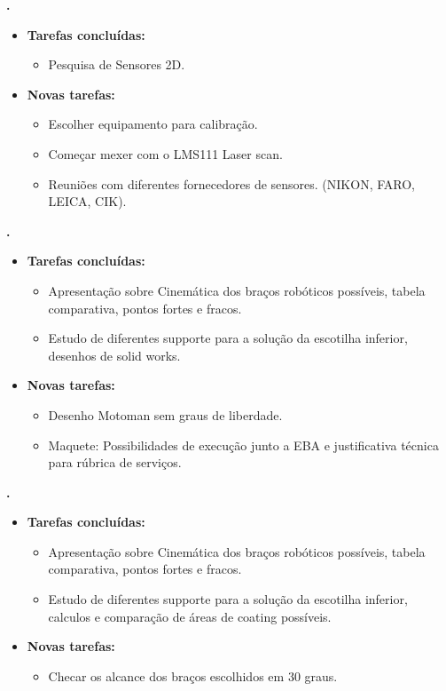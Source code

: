 \textbf{\gabriel.} 
	\begin{itemize}
		\item \textbf{Tarefas concluídas:}
			\begin{itemize}    
				\item Pesquisa de Sensores 2D.
			\end{itemize}
		
		\item \textbf{Novas tarefas:}
			\begin{itemize} 
				\item Escolher equipamento para calibração.
				\item Começar mexer com o LMS111 Laser scan. 
				\item Reuniões com diferentes fornecedores de sensores. (NIKON, FARO,
				LEICA, CIK).
			\end{itemize}
	\end{itemize}
					
			
   \textbf{.} 
	\begin{itemize}
		\item \textbf{Tarefas concluídas:}
			\begin{itemize}    
				\item Apresentação sobre Cinemática dos braços robóticos possíveis, 
				tabela comparativa, pontos fortes e fracos.
				\item Estudo de diferentes supporte para a solução da escotilha inferior,
				desenhos de solid works.
			\end{itemize}
		
		\item \textbf{Novas tarefas:}
			\begin{itemize} 
			    \item Desenho Motoman sem graus de liberdade.
			    \item Maquete: Possibilidades de execução junto a EBA e justificativa
			    técnica para rúbrica de serviços.
			\end{itemize}
	\end{itemize}

			
   \textbf{\Renan.} 
	\begin{itemize}
		\item \textbf{Tarefas concluídas:}
			\begin{itemize}    
				\item Apresentação sobre Cinemática dos braços robóticos possíveis, 
				tabela comparativa, pontos fortes e fracos.
				\item Estudo de diferentes supporte para a solução da escotilha inferior,
				calculos e comparação de áreas de coating possíveis.
			\end{itemize}
		
		\item \textbf{Novas tarefas:}
			\begin{itemize} 
			    \item Checar os alcance dos braços escolhidos em 30 graus.
			\end{itemize}
	\end{itemize}		



